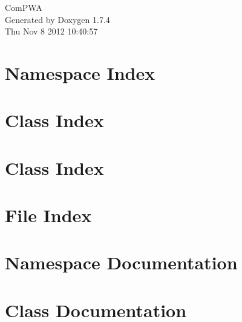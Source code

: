 \documentclass[a4paper]{book}
\begin{document}
\hypersetup{pageanchor=false}
\begin{titlepage}
\vspace*{7cm}
\begin{center}
{\Large ComPWA }\\
\vspace*{1cm}
{\large Generated by Doxygen 1.7.4}\\
\vspace*{0.5cm}
{\small Thu Nov 8 2012 10:40:57}\\
\end{center}
\end{titlepage}
\clearemptydoublepage
{}
\tableofcontents
\clearemptydoublepage
{}
\hypersetup{pageanchor=true}
\chapter{Namespace Index}

\chapter{Class Index}

\chapter{Class Index}

\chapter{File Index}

\chapter{Namespace Documentation}




\chapter{Class Documentation}


















\end{document}
